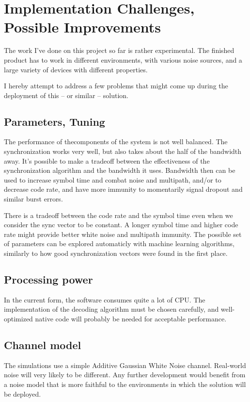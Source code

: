 \documentclass[a4paper]{article}
\begin{document}
\section{Implementation Challenges, Possible Improvements}

The work I've done on this project so far is rather experimental. The 
finished product has to work in different environments, with various
noise sources, and a large variety of devices with different
properties.

I hereby attempt to address a few problems that might come up during 
the deployment of this -- or similar -- solution.

\subsection{Parameters, Tuning}

The performance of thecomponents of the system is not well balanced.
The synchronization works very well, but also takes about the half of
the bandwidth away. It's possible to make a tradeoff between the
effectiveness of the synchronization algorithm and the bandwidth it
uses. Bandwidth then can be used to increase symbol time and combat
noise and multipath, and/or to decrease code rate, and have more
immunity to momentarily signal dropout and similar burst errors.

There is a tradeoff between the code rate and the symbol time even when
we consider the sync vector to be constant. A longer symbol time and
higher code rate might provide better white noise and multipath
immunity. The possible set of parameters can be explored automaticly
with machine learning algorithms, similarly to how good synchronization
vectors were found in the first place.

\subsection{Processing power}

In the current form, the software consumes quite a lot of CPU. The
implementation of the decoding algorithm must be chosen carefully, and
well-optimized native code will probably be needed for acceptable
performance.

\subsection{Channel model}

The simulations use a simple Additive Gaussian White Noise channel.
Real-world noise will very likely to be different. Any further
development would benefit from a noise model that is more faithful to
the environments in which the solution will be deployed.
\end{document}
